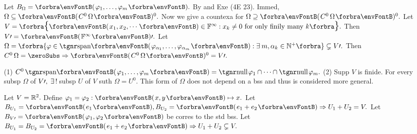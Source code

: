 Let $B_{\Omega}=\Par{\varphi_1,\dots,\varphi_m}.$ By {} and Exe (4E 23).\PfEnd\vspace{1pt}
\AExa Immed, $\Omega\subseteq\Par{C^0\,\Omega}{^0}.$ Now we give a countexa for $\Omega\supseteq\Par{C^0\,\Omega}{^0}.$\parExa
Let $V=\Bra{\Par{x_1,x_2,\cdots}\in\Fbb^{\infty}:x_k\neq 0\text{ for only finily many }k}.$ Then $V\apostrophe=\Par{\Fbb^{\infty}}\apostrophe.$\parExa
Let $\Omega=\Bra[\envFontA]{\varphi\in\Span{\varphi_{\alpha_1},\dots,\varphi_{\alpha_m}}:\exists\:m,\alpha_k\in\Nbp}\subsetneq V\apostrophe.$ Then $C^0\,\Omega=\zeroSubs\Rightarrow\Par{C^0\,\Omega}{^0}=V\apostrophe.$\par\vspace{2pt}
\ACoro (1) $C^0\,\Span{\varphi_1,\dots,\varphi_m}=\null\varphi_1\cap\cdots\cap\null\varphi_m.$\parCor
(2) Supp $V$ is finide. For every subsp $\Omega$ of $V\prime,\;\exists\,!\,$subsp $U$ of $V$ suth $\Omega=U^0.$\vspace{-2pt}\parCor
{} {\FontSmall\tgsl This form of $\Omega$ does not depend on a bss and thus is considered more general.}\vspace{-2pt}\par
\SepLine

Let $V={\mathbb{R}}^2.$ Define $\varphi_1=\varphi_2:\Par{x,y}\mapsto x.$ Let $B_{U_1}=\Par{e_1},B_{U_2}=\Par{e_1+e_2}\Rightarrow U_1+U_2=V.$\parSol{}
\Or Let $B_{V\apostrophe}=\Par{\varphi_1,\varphi_2}$ be corres to the std bss. Let $B_{U_1}=B_{U_2}=\Par{e_1+e_2}\Rightarrow U_1+U_2\subsetneq V.$\PfEnd
\SepLine

\SepLine\pagebreak

